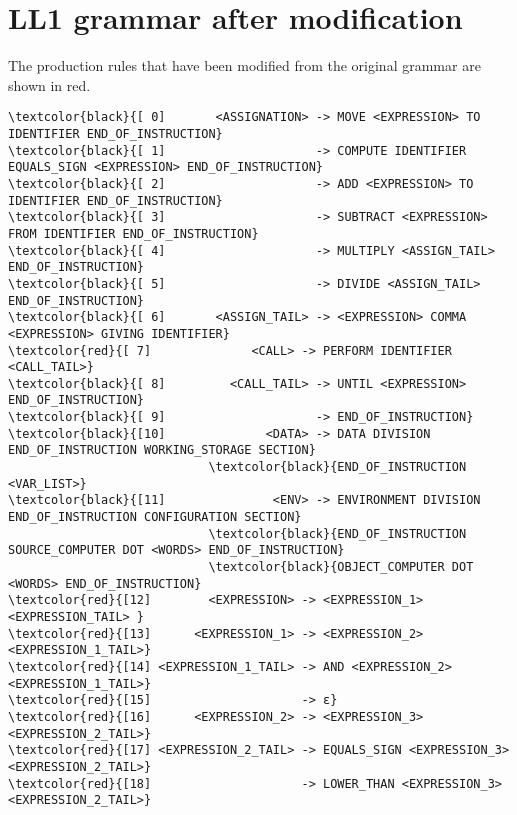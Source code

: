 \newpage\cleardoublepage{}
\section{LL1 grammar after modification}
\label{app:grammar}

The production rules that have been modified from the original grammar are shown in red.

\vspace{5mm}
\begingroup
\fontsize{8pt}{10pt}\selectfont
\begin{Verbatim}[commandchars=\\\{\}]
\textcolor{black}{[ 0]       <ASSIGNATION> -> MOVE <EXPRESSION> TO IDENTIFIER END_OF_INSTRUCTION}
\textcolor{black}{[ 1]                     -> COMPUTE IDENTIFIER EQUALS_SIGN <EXPRESSION> END_OF_INSTRUCTION}
\textcolor{black}{[ 2]                     -> ADD <EXPRESSION> TO IDENTIFIER END_OF_INSTRUCTION}
\textcolor{black}{[ 3]                     -> SUBTRACT <EXPRESSION> FROM IDENTIFIER END_OF_INSTRUCTION}
\textcolor{black}{[ 4]                     -> MULTIPLY <ASSIGN_TAIL> END_OF_INSTRUCTION}
\textcolor{black}{[ 5]                     -> DIVIDE <ASSIGN_TAIL> END_OF_INSTRUCTION}
\textcolor{black}{[ 6]       <ASSIGN_TAIL> -> <EXPRESSION> COMMA <EXPRESSION> GIVING IDENTIFIER}
\textcolor{red}{[ 7]              <CALL> -> PERFORM IDENTIFIER <CALL_TAIL>}
\textcolor{black}{[ 8]         <CALL_TAIL> -> UNTIL <EXPRESSION> END_OF_INSTRUCTION}
\textcolor{black}{[ 9]                     -> END_OF_INSTRUCTION}
\textcolor{black}{[10]              <DATA> -> DATA DIVISION END_OF_INSTRUCTION WORKING_STORAGE SECTION}
                            \textcolor{black}{END_OF_INSTRUCTION <VAR_LIST>}
\textcolor{black}{[11]               <ENV> -> ENVIRONMENT DIVISION END_OF_INSTRUCTION CONFIGURATION SECTION}
                            \textcolor{black}{END_OF_INSTRUCTION SOURCE_COMPUTER DOT <WORDS> END_OF_INSTRUCTION}
                            \textcolor{black}{OBJECT_COMPUTER DOT <WORDS> END_OF_INSTRUCTION}
\textcolor{red}{[12]        <EXPRESSION> -> <EXPRESSION_1> <EXPRESSION_TAIL> }
\textcolor{red}{[13]      <EXPRESSION_1> -> <EXPRESSION_2> <EXPRESSION_1_TAIL>}
\textcolor{red}{[14] <EXPRESSION_1_TAIL> -> AND <EXPRESSION_2> <EXPRESSION_1_TAIL>}
\textcolor{red}{[15]                     -> ε}
\textcolor{red}{[16]      <EXPRESSION_2> -> <EXPRESSION_3> <EXPRESSION_2_TAIL>}
\textcolor{red}{[17] <EXPRESSION_2_TAIL> -> EQUALS_SIGN <EXPRESSION_3> <EXPRESSION_2_TAIL>}
\textcolor{red}{[18]                     -> LOWER_THAN <EXPRESSION_3> <EXPRESSION_2_TAIL>}

\end{Verbatim}
